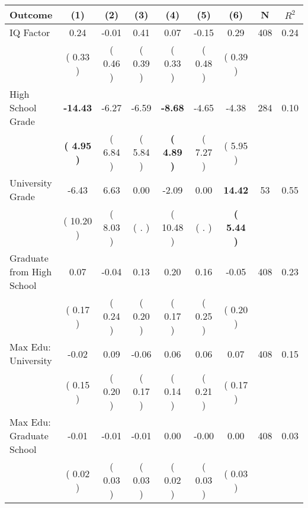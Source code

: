 \begin{tabular}{lcccccccc}
\toprule
 \textbf{Outcome} & \textbf{(1)} & \textbf{(2)} & \textbf{(3)} & \textbf{(4)} & \textbf{(5)} & \textbf{(6)} & \textbf{N} & \textbf{$ R^2$} \\
\midrule
IQ Factor &      0.24 &     -0.01 &      0.41 &      0.07 &     -0.15 &      0.29 & 408 &       0.24 \\ 
 & (     0.33 ) & (     0.46 ) & (     0.39 ) & (     0.33 ) & (     0.48 ) & (     0.39 ) & \\
High School Grade & \textbf{   -14.43} &     -6.27 &     -6.59 & \textbf{    -8.68} &     -4.65 &     -4.38 & 284 &       0.10 \\ 
 & \textbf{(     4.95 )} & (     6.84 ) & (     5.84 ) & \textbf{(     4.89 )} & (     7.27 ) & (     5.95 ) & \\
University Grade &     -6.43 &      6.63 &      0.00 &     -2.09 &      0.00 & \textbf{    14.42} & 53 &       0.55 \\ 
 & (    10.20 ) & (     8.03 ) & (        . ) & (    10.48 ) & (        . ) & \textbf{(     5.44 )} & \\
Graduate from High School &      0.07 &     -0.04 &      0.13 &      0.20 &      0.16 &     -0.05 & 408 &       0.23 \\ 
 & (     0.17 ) & (     0.24 ) & (     0.20 ) & (     0.17 ) & (     0.25 ) & (     0.20 ) & \\
Max Edu: University &     -0.02 &      0.09 &     -0.06 &      0.06 &      0.06 &      0.07 & 408 &       0.15 \\ 
 & (     0.15 ) & (     0.20 ) & (     0.17 ) & (     0.14 ) & (     0.21 ) & (     0.17 ) & \\
Max Edu: Graduate School &     -0.01 &     -0.01 &     -0.01 &      0.00 &     -0.00 &      0.00 & 408 &       0.03 \\ 
 & (     0.02 ) & (     0.03 ) & (     0.03 ) & (     0.02 ) & (     0.03 ) & (     0.03 ) & \\
\bottomrule
\end{tabular}
